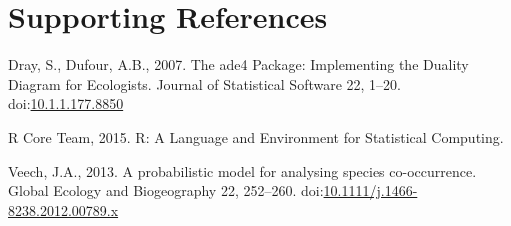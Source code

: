 \newpage

\newpage

\section*{Supporting References}\label{supporting-references}

\hypertarget{refs}{}
\hypertarget{ref-Dray2007}{}
Dray, S., Dufour, A.B., 2007. The ade4 Package: Implementing the Duality
Diagram for Ecologists. Journal of Statistical Software 22, 1--20.
doi:\href{https://doi.org/10.1.1.177.8850}{10.1.1.177.8850}

\hypertarget{ref-Rcoreteam2015}{}
R Core Team, 2015. R: A Language and Environment for Statistical
Computing.

\hypertarget{ref-Veech2013}{}
Veech, J.A., 2013. A probabilistic model for analysing species
co-occurrence. Global Ecology and Biogeography 22, 252--260.
doi:\href{https://doi.org/10.1111/j.1466-8238.2012.00789.x}{10.1111/j.1466-8238.2012.00789.x}
